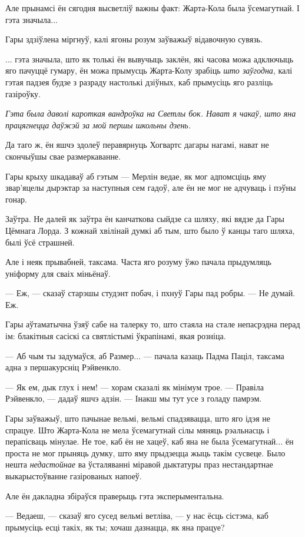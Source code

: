 Але прынамсі ён сягодня высветліў важны факт: Жарта-Кола была ўсемагутнай. І гэта значыла...

Гары здзіўлена міргнуў, калі ягоны розум заўважыў відавочную сувязь. 

... гэта значыла, што як толькі ён вывучыць заклён, які часова можа адключыць яго 
пачуццё гумару, ён можа прымусць Жарта-Колу зрабіць \emph{што заўгодна}, калі гэтая
падзея будзе з разраду настолькі дзіўных, каб прымусіць яго разліць газіроўку. 

\emph{Гэта была даволі кароткая вандроўка на Светлы бок. Нават я чакаў, што 
яна працягнецца даўжэй за мой першы школьны дзень.}

Да таго ж, ён яшчэ здолеў перавярнуць Хогвартс дагары нагамі, нават не скончыўшы 
свае размеркаванне.

Гары крыху шкадаваў аб гэтым --- Мерлін ведае, як мог адпомсціць яму звар'яцелы дырэктар
за наступныя сем гадоў, але ён не мог не адчуваць і пэўны гонар.

Заўтра. Не далей як заўтра ён канчаткова сыйдзе са шляху, які вядзе да Гары Цёмнага Лорда.
З кожнай хвілінай думкі аб тым, што было ў канцы таго шляха, былі ўсё страшней.

Але і неяк прывабней, таксама. Часта яго розуму ўжо пачала прыдумляць уніформу для
сваіх міньёнаў.

--- Еж, --- сказаў старэшы студэнт побач, і пхнуў Гары пад робры. --- Не думай. Еж.

Гары аўтаматычна ўзяў сабе на талерку то, што стаяла на стале непасрэдна
перад ім: блакітныя сасіскі са святлістымі ўкрапінамі, якая розніца.

--- Аб чым ты задумаўся, аб Размер... --- пачала казаць Падма Паціл, таксама адна з 
першакурсніц Рэйвенкло.

--- Як ем, дык глух і нем! --- хорам сказалі як мінімум трое. --- Правіла Рэйвенкло, 
--- дадаў яшчэ адзін. --- Інакш мы тут усе з голаду памрэм.

Гары заўважыў, што пачынае вельмі, вельмі спадзявацца, што яго ідэя не спрацуе. 
Што Жарта-Кола не мела ўсемагутнай сілы мяняць рэальнасць і перапісваць мінулае.
Не тое, каб ён не хацеў, каб яна не была ўсемагутнай... ён проста не мог 
прыняць думку, што яму прыдзецца жыць такім сусвеце. Было нешта 
\emph{недастойнае} ва ўсталяванні міравой дыктатуры 
праз нестандартнае выкарыстоўванне газірованых напоеў.

Але ён дакладна збіраўся праверыць гэта эксперыментальна.

--- Ведаеш, --- сказаў яго сусед вельмі ветліва, --- у нас ёсць сістэма, каб прымусіць
есці такіх, як ты; хочаш дазнацца, як яна працуе?

